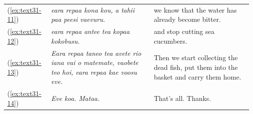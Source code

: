 \documentclass[output=paper]{langscibook}
\begin{document}
\begin{xltabular}{\textwidth}{lXX}
	(\ref{ex:text31-11})&\textit{eara repaa kona kou, a tahii paa peesi vaevuru.}&we know that the water has already become bitter.\\
	(\ref{ex:text31-12})&\textit{eara repaa antee tea kopaa kokobusu.}&and stop cutting sea cucumbers.\\
	(\ref{ex:text31-13})&\textit{Eara repaa taneo tea avete rio iana vai o matemate, vaobete teo hoi, eara repaa kae voosu eve.}&Then we start collecting the dead fish, put them into the basket and carry them home.\\
	(\ref{ex:text31-14})&\textit{Eve koa. Mataa.}&That's all. Thanks.\\
\end{xltabular}
\end{document}
